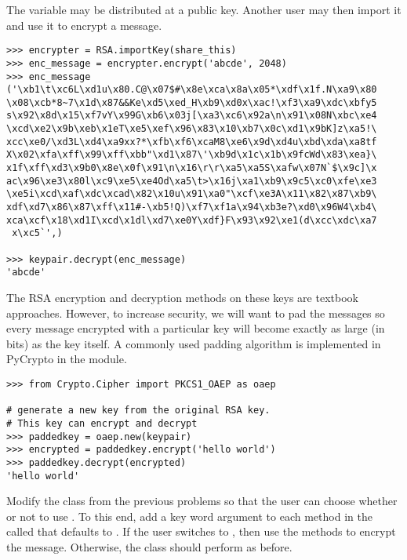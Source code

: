The  variable may be distributed at a public key.
Another user may then import it and use it to encrypt a message.

\begin{lstlisting}
>>> encrypter = RSA.importKey(share_this)
>>> enc_message = encrypter.encrypt('abcde', 2048)
>>> enc_message
('\xb1\t\xc6L\xd1u\x80.C@\x07$#\x8e\xca\x8a\x05*\xdf\x1f.N\xa9\x80
\x08\xcb*8~7\x1d\x87&&Ke\xd5\xed_H\xb9\xd0x\xac!\xf3\xa9\xdc\xbfy5
s\x92\x8d\x15\xf7vY\x99G\xb6\x03j[\xa3\xc6\x92a\n\x91\x08N\xbc\xe4
\xcd\xe2\x9b\xeb\x1eT\xe5\xef\x96\x83\x10\xb7\x0c\xd1\x9bK]z\xa5!\
xcc\xe0/\xd3L\xd4\xa9xx?*\xfb\xf6\xcaM8\xe6\x9d\xd4u\xbd\xda\xa8tf
X\x02\xfa\xff\x99\xff\xbb"\xd1\x87\'\xb9d\x1c\x1b\x9fcWd\x83\xea}\
x1f\xff\xd3\x9b0\x8e\x0f\x91\n\x16\r\r\xa5\xa5S\xafw\x07N`$\x9c]\x
ac\x96\xe3\x80l\xc9\xe5\xe4Od\xa5\t>\x16j\xa1\xb9\x9c5\xc0\xfe\xe3
\xe5i\xcd\xaf\xdc\xcad\x82\x10u\x91\xa0"\xcf\xe3A\x11\x82\x87\xb9\
xdf\xd7\x86\x87\xff\x11#-\xb5!Q)\xf7\xf1a\x94\xb3e?\xd0\x96W4\xb4\
xca\xcf\x18\xd1I\xcd\x1dl\xd7\xe0Y\xdf}F\x93\x92\xe1(d\xcc\xdc\xa7
 x\xc5`',)

>>> keypair.decrypt(enc_message)
'abcde'
\end{lstlisting}

The RSA encryption and decryption methods on these keys are textbook approaches.
However, to increase security, we will want to pad the messages so every message encrypted with a particular key will become exactly as large (in bits) as the key itself.
A commonly used padding algorithm is implemented in PyCrypto in the  module.
\begin{lstlisting}
>>> from Crypto.Cipher import PKCS1_OAEP as oaep

# generate a new key from the original RSA key.
# This key can encrypt and decrypt
>>> paddedkey = oaep.new(keypair)
>>> encrypted = paddedkey.encrypt('hello world')
>>> paddedkey.decrypt(encrypted)
'hello world'
\end{lstlisting}

\begin{problem}
Modify the  class from the previous problems so that the user can choose whether or not to use .
To this end, add a key word argument to each method in the  called  that defaults to .
If the user switches  to , then use the  methods to encrypt the message.
Otherwise, the class should perform as before.
\end{problem}


